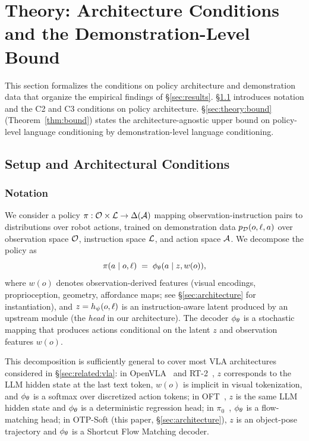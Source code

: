 
\section{Theory: Architecture Conditions and the Demonstration-Level Bound}
\label{sec:theory}

This section formalizes the conditions on policy architecture and demonstration data that
organize the empirical findings of \S\ref{sec:results}. \S\ref{sec:theory:setup}
introduces notation and the C2 and C3 conditions on policy architecture.
\S\ref{sec:theory:bound} (Theorem~\ref{thm:bound}) states the architecture-agnostic upper
bound on policy-level language conditioning by demonstration-level language conditioning.

\subsection{Setup and Architectural Conditions}
\label{sec:theory:setup}

\subsubsection{Notation}
\label{sec:theory:notation}

We consider a policy $\pi: \mathcal{O} \times \mathcal{L} \to \Delta(\mathcal{A})$ mapping
observation-instruction pairs to distributions over robot actions, trained on
demonstration data $p_{\mathcal{D}}(o, \ell, a)$ over observation space $\mathcal{O}$, instruction space
$\mathcal{L}$, and action space $\mathcal{A}$. We decompose the policy as
\begin{equation}
\pi(a \mid o, \ell) \;=\; \phi_{\theta}(a \mid z, w(o)),
\label{eq:policy_decomposition}
\end{equation}
where $w(o)$ denotes observation-derived features (visual encodings, proprioception,
geometry, affordance maps; see \S\ref{sec:architecture} for instantiation), and $z =
h_{\psi}(o, \ell)$ is an instruction-aware latent produced by an upstream module (the
\emph{head} in our architecture). The decoder $\phi_{\theta}$ is a stochastic mapping that
produces actions conditional on the latent $z$ and observation features $w(o)$.

This decomposition is sufficiently general to cover most VLA architectures considered in
\S\ref{sec:related:vla}: in OpenVLA~\cite{kim2024openvla} and RT-2~\cite{brohan2023rt2},
$z$ corresponds to the LLM hidden state at the last text token, $w(o)$ is implicit in
visual tokenization, and $\phi_{\theta}$ is a softmax over discretized action tokens; in
OFT~\cite{kim2025openvla_oft}, $z$ is the same LLM hidden state and $\phi_{\theta}$ is a
deterministic regression head; in $\pi_0$~\cite{black2024pi0}, $\phi_{\theta}$ is a
flow-matching head; in OTP-Soft (this paper, \S\ref{sec:architecture}), $z$ is an
object-pose trajectory and $\phi_{\theta}$ is a Shortcut Flow Matching decoder.

